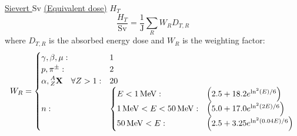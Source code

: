 		\href{https://en.wikipedia.org/wiki/Sievert}{Sievert $\mathrm{Sv}$} \href{https://en.wikipedia.org/wiki/Equivalent_dose}{(Equivalent dose)} $H_T$
		\begin{equation}
			\frac{H_T}{\mathrm{Sv}} = \frac{1}{\mathrm{J}}\sum_R W_R D_{T,R}			
		\end{equation}
		where $D_{T,R}$ is the absorbed energy dose and $W_R$ is the weighting factor:
		\begin{equation}
			\begin{aligned}
				W_R =
				\begin{cases}
					\gamma,\beta,\mu: & 1 \\
					p, \pi^\pm: & 2 \\
					\alpha, \prescript{A}{Z}{\mathbf{X}}\quad\forall Z>1: & 20 \\
					n: &\begin{cases}
						E<1\,\mathrm{MeV}: & \qty(2.5+18.2 e^{\ln^2(E)/6}) \\
						1\,\mathrm{MeV} <E<50\,\mathrm{MeV}: & \qty(5.0+17.0 e^{\ln^2(2E)/6}) \\
						50\,\mathrm{MeV}<E: & \qty(2.5+3.25 e^{\ln^2(0.04E)/6}) \\
					\end{cases}
				\end{cases}\\
			\end{aligned}
		\end{equation}
